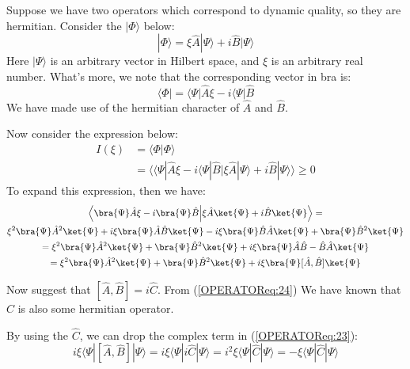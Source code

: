 Suppose we have two operators which correspond to dynamic quality,
so they are hermitian. Consider the $|\Phi\rangle$ below:
\begin{equation}\label{OPERATOReq:19}
|\Phi\rangle = \xi\hat{A}|\Psi\rangle+i\hat{B}|\Psi\rangle
\end{equation}
Here $|\Psi\rangle$ is an arbitrary vector in Hilbert space, and
$\xi$ is an arbitrary real number. What's more, we note that the
corresponding vector in bra is:
\begin{equation}\label{}
\langle\Phi| = \langle\Psi|\hat{A}\xi-i\langle\Psi|\hat{B}
\end{equation}
We have made use of the hermitian character of $\hat{A}$ and
$\hat{B}$.

Now consider the expression below:
\begin{align}\label{OPERATOReq:22}
I(\xi) &= \langle\Phi|\Phi\rangle  \nonumber \\
&= \Big\langle \langle\Psi|\hat{A}\xi-i\langle\Psi|\hat{B}\Big|
\xi\hat{A}|\Psi\rangle+i\hat{B}|\Psi\rangle\Big\rangle \geq 0
\end{align}
To expand this expression, then we have:
\begin{multline}\label{OPERATOReq:23}
\Big\langle \bra{\Psi}\hat{A}\xi-i\bra{\Psi}\hat{B} \Big|
\xi\hat{A}\ket{\Psi}+i\hat{B}\ket{\Psi} \Big\rangle =
\\
\xi^{2}\bra{\Psi}\hat{A}^{2}\ket{\Psi} +
i\xi\bra{\Psi}\hat{A}\hat{B}\ket{\Psi} -
i\xi\bra{\Psi}\hat{B}\hat{A}\ket{\Psi}+
\bra{\Psi}\hat{B}^{2}\ket{\Psi} \\
=\xi^{2}\bra{\Psi}\hat{A}^{2}\ket{\Psi} +
\bra{\Psi}\hat{B}^{2}\ket{\Psi}  +
i\xi\bra{\Psi}\hat{A}\hat{B}-\hat{B}\hat{A}\ket{\Psi} \\
=\xi^{2}\bra{\Psi}\hat{A}^{2}\ket{\Psi} +
\bra{\Psi}\hat{B}^{2}\ket{\Psi}  + i\xi\bra{\Psi}[\hat{A},
\hat{B}]\ket{\Psi}
\end{multline}

Now suggest that $[\hat{A},\hat{B}] = i\hat{C}$. From
(\ref{OPERATOReq:24}) We have known that $\hat{C}$ is also some
hermitian operator.

By using the $\hat{C}$, we can drop the complex term in
(\ref{OPERATOReq:23}):
\begin{equation}\label{OPERATOReq:25}
i\xi\langle\Psi|[\hat{A},\hat{B}]|\Psi\rangle =
i\xi\langle\Psi|i\hat{C}|\Psi\rangle =
i^{2}\xi\langle\Psi|\hat{C}|\Psi\rangle =
-\xi\langle\Psi|\hat{C}|\Psi\rangle
\end{equation}

